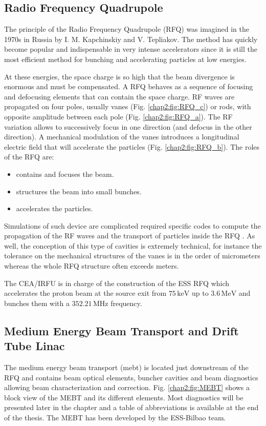 \begin{refsection}
  \subsection{Radio Frequency Quadrupole}
  The principle of the Radio Frequency Quadrupole (RFQ) was imagined in the 1970s in Russia by I. M. Kapchinskiy and V. Tepliakov. The method has quickly become popular and indispensable in very intense accelerators since it is still the most efficient method for bunching and accelerating particles at low energies.

  At these energies, the space charge is so high that the beam divergence is enormous and must be compensated. A RFQ behaves as a sequence of focusing and defocusing elements that can contain the space charge. RF waves are propagated on four poles, usually vanes (Fig. \ref{chap2:fig:RFQ_c}) or rods, with opposite amplitude between each pole (Fig. \ref{chap2:fig:RFQ_a}). The RF variation allows to successively focus in one direction (and defocus in the other direction). A mechanical modulation of the vanes introduces a longitudinal electric field that will accelerate the particles (Fig. \ref{chap2:fig:RFQ_b}). The roles of the RFQ are:
  \begin{itemize}
    \item contains and focuses the beam.
    \item structures the beam into small bunches.
    \item accelerates the particles.
  \end{itemize}

  

  Simulations of such device are complicated required specific codes to compute the propagation of the RF waves and the transport of particles inside the RFQ \cite{Duperrier2000}. As well, the conception of this type of cavities is extremely technical, for instance the tolerance on the mechanical structures of the vanes is in the order of micrometers whereas the whole RFQ structure often exceeds meters.

  The CEA/IRFU is in charge of the construction of the ESS RFQ \cite{ChirpazIPAC2016} which accelerates the proton beam at the source exit from $75\,\mathrm{keV}$ up to $3.6\,\mathrm{MeV}$ and bunches them with a $352.21\,\mathrm{MHz}$ frequency.

  \subsection{Medium Energy Beam Transport and Drift Tube Linac}
  The medium energy beam transport (\acrshort{mebt}) is located just downstream of the RFQ and contains beam optical elements, buncher cavities and beam diagnostics allowing beam characterization and correction. Fig. \ref{chap2:fig:MEBT} shows a block view of the MEBT and its different elements. Most diagnostics will be presented later in the chapter and a table of abbreviations is available at the end of the thesis. The MEBT has been developed by the ESS-Bilbao team.


\end{refsection}
